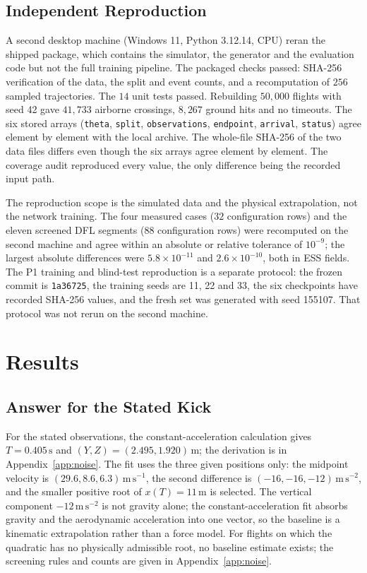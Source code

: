 \documentclass[11pt,a4paper]{article}
\begin{document}
\subsection{Independent Reproduction}
\label{sec:repro}

A second desktop machine (Windows 11, Python 3.12.14, CPU) reran the shipped package, which contains the simulator, the generator and the evaluation code but not the full training pipeline. The packaged checks passed: SHA-256 verification of the data, the split and event counts, and a recomputation of $256$ sampled trajectories. The $14$ unit tests passed. Rebuilding $50{,}000$ flights with seed 42 gave $41{,}733$ airborne crossings, $8{,}267$ ground hits and no timeouts. The six stored arrays (\texttt{theta}, \texttt{split}, \texttt{observations}, \texttt{endpoint}, \texttt{arrival}, \texttt{status}) agree element by element with the local archive. The whole-file SHA-256 of the two data files differs even though the six arrays agree element by element. The coverage audit reproduced every value, the only difference being the recorded input path.

The reproduction scope is the simulated data and the physical extrapolation, not the network training. The four measured cases ($32$ configuration rows) and the eleven screened DFL segments ($88$ configuration rows) were recomputed on the second machine and agree within an absolute or relative tolerance of $10^{-9}$; the largest absolute differences were $5.8\times10^{-11}$ and $2.6\times10^{-10}$, both in ESS fields. The P1 training and blind-test reproduction is a separate protocol: the frozen commit is \texttt{1a36725}, the training seeds are 11, 22 and 33, the six checkpoints have recorded SHA-256 values, and the fresh set was generated with seed 155107. That protocol was not rerun on the second machine.

\section{Results}
\subsection{Answer for the Stated Kick}
\label{sec:case}

For the stated observations, the constant-acceleration calculation gives $T=0.405\,\mathrm{s}$ and $(Y,Z)=(2.495,1.920)\,\mathrm{m}$; the derivation is in Appendix~\ref{app:noise}. The fit uses the three given positions only: the midpoint velocity is $(29.6,8.6,6.3)\,\mathrm{m\,s^{-1}}$, the second difference is $(-16,-16,-12)\,\mathrm{m\,s^{-2}}$, and the smaller positive root of $x(T)=11\,\mathrm{m}$ is selected. The vertical component $-12\,\mathrm{m\,s^{-2}}$ is not gravity alone; the constant-acceleration fit absorbs gravity and the aerodynamic acceleration into one vector, so the baseline is a kinematic extrapolation rather than a force model. For flights on which the quadratic has no physically admissible root, no baseline estimate exists; the screening rules and counts are given in Appendix~\ref{app:noise}.
\end{document}
